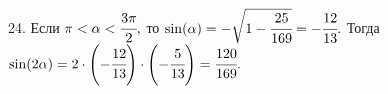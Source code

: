 24. Если $\pi<\alpha<\cfrac{3\pi}{2},$ то  $\sin(\alpha)=-\sqrt{1-\cfrac{25}{169}}=-\cfrac{12}{13}.$ Тогда $\sin(2\alpha)=2\cdot\left(-\cfrac{12}{13}\right)\cdot\left(-\cfrac{5}{13}\right)=\cfrac{120}{169}.$\\
